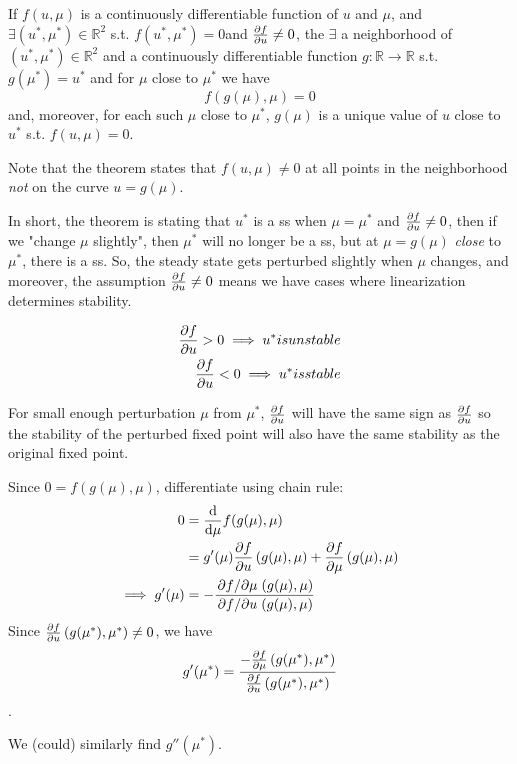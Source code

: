 \documentclass[12pt, oneside]{article}
\begin{document}
\begin{theorem}\label{thm:ift}
  If $f(u, \mu)$ is a continuously differentiable function of $u$ and $\mu$, and $\exists (u^*,\mu^*) \in \mathbb{R}^2$ s.t. $f(u^*,\mu^*) = 0$\footnotemark and $\pdv{f}{u}(u^*,\mu^*) \neq 0$, the $\exists$ a neighborhood of $(u^*, \mu^*) \in \mathbb{R}^2$ and a continuously differentiable function $g: \mathbb{R} \to \mathbb{R}$ s.t. $g(\mu^*)= u^*$ and for $\mu$ close to $\mu^*$ we have \[f(g(\mu), \mu) = 0\] and, moreover, for each such $\mu$ close to $\mu^*$, $g(\mu)$ is a unique value of $u$ close to $u^*$ s.t. $f(u, \mu) = 0$.\footnotemark
\end{theorem}


Note that the theorem states that $f(u, \mu) \neq 0$ at all points in the neighborhood \textit{not} on the curve $u = g(\mu)$.

In short, the theorem is stating that $u^*$ is a ss when $\mu = \mu^*$ and $\pdv{f}{u}(u^*, \mu^*)\neq 0$, then if we "change $\mu$ slightly", then $\mu^*$ will no longer be a ss, but at $\mu = g(\mu)$ \textit{close} to $\mu^*$, there is a ss. So, the steady state gets perturbed slightly when $\mu$ changes, and moreover, the assumption $\pdv{f}{u}(u^*, \mu^*)\neq 0$ means we have cases where linearization determines stability.

\begin{align*}
  \pdv{f}{u}(u^*, \mu^*) > 0 \implies u^* is unstable\\
  \pdv{f}{u}(u^*, \mu^*) < 0 \implies u^* is stable
\end{align*}

For small enough perturbation $\mu$ from $\mu^*$, $\pdv{f}{u}(g(\mu), \mu)$ will have the same sign as $\pdv{f}{u}(u^*, \mu^*)$ so the stability of the perturbed fixed point will also have the same stability as the original fixed point.

\begin{remark}
  Since $0 = f(g(\mu), \mu)$, differentiate using chain rule:
  \begin{align*}
    0 &= \dv{\mu} f(g(\mu), \mu)\\
    &= g'(\mu)\pdv{f}{u} \left(g(\mu), \mu\right) + \pdv{f}{\mu} \left(g(\mu), \mu\right)\\
    \implies g'(\mu) &= - \frac{\pdv*{f}{\mu} \left(g(\mu), \mu\right)}{\pdv*{f}{u} \left(g(\mu), \mu\right)}
  \end{align*}
  Since $\pdv{f}{u} \left(g(\mu^*), \mu^*\right) \neq 0$, we have \[g'(\mu^*) = \frac{-\pdv{f}{\mu} \left(g(\mu^*), \mu^*\right)}{\pdv{f}{u} \left(g(\mu^*), \mu^*\right)}\]. 

  We (could) similarly find $g''(\mu^*)$.
\end{remark}
\end{document}
